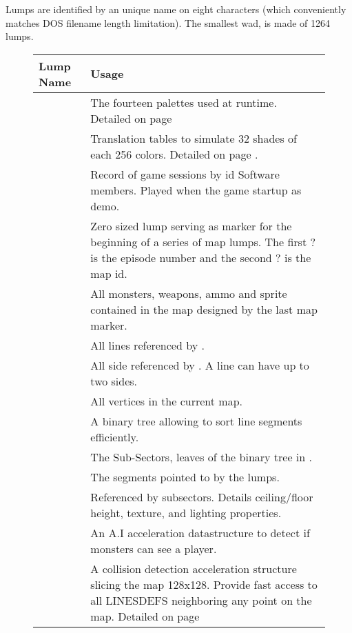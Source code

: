 Lumps are identified by an unique name on eight characters (which conveniently matches DOS filename length limitation). The smallest wad,  is made of 1264 lumps.\\
\par
{}
\pagebreak

\begin{figure}[H]
\centering  
\begin{tabularx}{\textwidth}{ L{0.2}  L{0.8}}
  \toprule
  \textbf{Lump Name} &  \textbf{Usage} \\
   
  \toprule 
   & The fourteen palettes used at runtime. Detailed on page \pageref{label_palettes} \\
   & Translation tables to simulate 32 shades of each 256 colors. Detailed on page \pageref{diminishedlightning}. \\
   &  Record of game sessions by id Software members. Played when the game startup as demo.\\
  \toprule
   & Zero sized lump serving as marker for the beginning of a series of map lumps. The first ? is the episode number and the second ? is the map id.\\
   & All monsters, weapons, ammo and sprite contained in the map designed by the last map marker.\\
   & All lines referenced by .\\
   & All side referenced by . A line can have up to two sides.\\
   & All vertices in the current map.\\
   & A binary tree allowing to sort line segments efficiently. \\
   &  The Sub-Sectors, leaves of the binary tree in .  \\
   &  The segments pointed to by the  lumps.\\
   &  Referenced by subsectors. Details ceiling/floor height, texture, and lighting properties.\\
   &  An A.I acceleration datastructure to detect if monsters can see a player.\\
   & A collision detection acceleration structure slicing the map 128x128. Provide fast access to all LINESDEFS neighboring any point on the map. Detailed on page \pageref{blockmapdetails} \\

\end{tabularx}
\end{figure}
